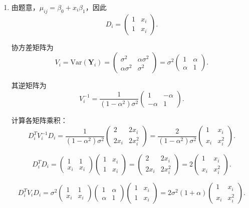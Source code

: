 \begin{enumerate}[label=(\alph*)]
\item 由题意，$\mu_{ij} = \beta_0 + x_i\beta_1$，因此
\[
  D_i = \begin{pmatrix} 1 & x_i \\ 1 & x_i \end{pmatrix}.
\]

协方差矩阵为
\[
  V_i = \text{Var}(\boldsymbol{Y}_i) = \begin{pmatrix} \sigma^2 & \alpha\sigma^2 \\ \alpha\sigma^2 & \sigma^2 \end{pmatrix} = \sigma^2 \begin{pmatrix} 1 & \alpha \\ \alpha & 1 \end{pmatrix}.
\]

其逆矩阵为
\[
  V_i^{-1} = \frac{1}{(1-\alpha^2)\sigma^2} \begin{pmatrix} 1 & -\alpha \\ -\alpha & 1 \end{pmatrix}.
\]

计算各矩阵乘积：
\[
  D_i^T V_i^{-1} D_i = \frac{1}{(1-\alpha^2)\sigma^2} \begin{pmatrix} 2 & 2x_i \\ 2x_i & 2x_i^2 \end{pmatrix} = \frac{2}{(1-\alpha^2)\sigma^2} \begin{pmatrix} 1 & x_i \\ x_i & x_i^2 \end{pmatrix}.
\]

\[
  D_i^T D_i = \begin{pmatrix} 1 & 1 \\ x_i & x_i \end{pmatrix} \begin{pmatrix} 1 & x_i \\ 1 & x_i \end{pmatrix} = \begin{pmatrix} 2 & 2x_i \\ 2x_i & 2x_i^2 \end{pmatrix} = 2\begin{pmatrix} 1 & x_i \\ x_i & x_i^2 \end{pmatrix}.
\]

\[
  D_i^T V_i D_i = \sigma^2 \begin{pmatrix} 1 & 1 \\ x_i & x_i \end{pmatrix} \begin{pmatrix} 1 & \alpha \\ \alpha & 1 \end{pmatrix} \begin{pmatrix} 1 & x_i \\ 1 & x_i \end{pmatrix} = 2\sigma^2(1+\alpha) \begin{pmatrix} 1 & x_i \\ x_i & x_i^2 \end{pmatrix}.
\]


\end{enumerate}
